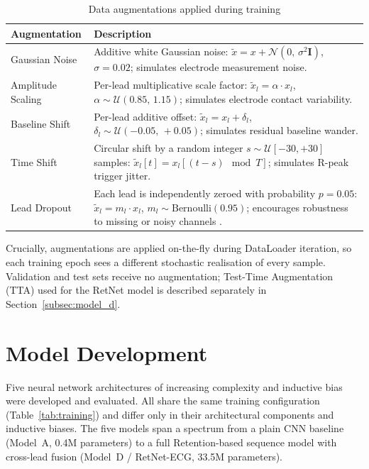 \begin{table}[htbp]
  \centering
  \caption{Data augmentations applied during training}
  \label{tab:augmentations}
  \begin{tabular}{p{3.5cm}p{8.5cm}}
    \hline
    \textbf{Augmentation}  & \textbf{Description} \\
    \hline
    Gaussian Noise    &
      Additive white Gaussian noise:
      $\tilde{x} = x + \mathcal{N}(0,\, \sigma^2 \mathbf{I})$,
      $\sigma = 0.02$; simulates electrode measurement noise. \\[4pt]
    Amplitude Scaling &
      Per-lead multiplicative scale factor:
      $\tilde{x}_l = \alpha \cdot x_l$,
      $\alpha \sim \mathcal{U}(0.85,\, 1.15)$;
      simulates electrode contact variability. \\[4pt]
    Baseline Shift    &
      Per-lead additive offset:
      $\tilde{x}_l = x_l + \delta_l$,
      $\delta_l \sim \mathcal{U}(-0.05,\, +0.05)$;
      simulates residual baseline wander. \\[4pt]
    Time Shift        &
      Circular shift by a random integer $s \sim \mathcal{U}[-30, +30]$
      samples:
      $\tilde{x}_l[t] = x_l[(t - s)\!\mod T]$;
      simulates R-peak trigger jitter. \\[4pt]
    Lead Dropout      &
      Each lead is independently zeroed with probability $p = 0.05$:
      $\tilde{x}_l = m_l \cdot x_l$,
      $m_l \sim \mathrm{Bernoulli}(0.95)$;
      encourages robustness to missing or noisy channels \cite{ref22}. \\
    \hline
  \end{tabular}
\end{table}

\noindent Crucially, augmentations are applied on-the-fly during
DataLoader iteration, so each training epoch sees a different
stochastic realisation of every sample.
Validation and test sets receive no augmentation;
Test-Time Augmentation (TTA) used for the RetNet model is described
separately in Section~\ref{subsec:model_d}.

\section{Model Development}
\label{sec:model_development}

Five neural network architectures of increasing complexity and
inductive bias were developed and evaluated.
All share the same training configuration (Table~\ref{tab:training})
and differ only in their architectural components and inductive biases.
The five models span a spectrum from a plain CNN baseline
(Model~A, \texttildelow 0.4M parameters) to a full Retention-based
sequence model with cross-lead fusion
(Model~D / RetNet-ECG, 33.5M parameters).


